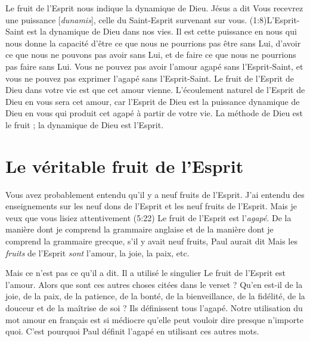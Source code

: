 \Og Le fruit de l'Esprit \Fg{} nous indique la dynamique de Dieu.
 Jésus a dit\frcolon{} \Og Vous recevrez une puissance [\emph{dunamis}],
 celle du Saint-Esprit survenant sur vous. \Fg{}
 (1:8)L'Esprit-Saint est la dynamique de Dieu dans nos vies.
 Il est cette puissance en nous qui nous donne la capacité
 d'être ce que nous ne pourrions pas être sans Lui,
 d'avoir ce que nous ne pouvons pas avoir sans Lui,
 et de faire ce que nous ne pourrions pas faire sans Lui.
 Vous ne pouvez pas avoir l'amour agapé sans l'Esprit-Saint,
 et vous ne pouvez pas exprimer l'agapé sans l'Esprit-Saint.
 Le fruit de l'Esprit de Dieu dans votre vie est que cet amour vienne.
 L'écoulement naturel de l'Esprit de Dieu en vous sera cet amour,
 car l'Esprit de Dieu est la puissance dynamique de Dieu
 en vous qui produit cet agapé à partir de votre vie.
 La méthode de Dieu est le fruit ; la dynamique de Dieu est l'Esprit.


\section{Le v\'eritable fruit de l'Esprit}

Vous avez probablement entendu qu'il y a neuf fruits de l'Esprit.
 J'ai entendu des enseignements sur les neuf dons de l'Esprit
 et les neuf fruits de l'Esprit. Mais je veux que vous lisiez
 attentivement (5:22)\frcolon{}
 \Og Le fruit de l'Esprit est l'\emph{agapé}. \Fg{}
 De la manière dont je comprend la grammaire anglaise
 et de la manière dont je comprend la grammaire grecque,
 s'il y avait neuf fruits, Paul aurait dit\frcolon{}
 \Og Mais les \emph{fruits} de l'Esprit \emph{sont} l'amour,
 la joie, la paix, etc. \Fg{}

Mais ce n'est pas ce qu'il a dit. Il a utilisé le singulier\frcolon{}
 \Og Le fruit de l'Esprit est l'amour. \Fg{}
 Alors que sont ces autres choses citées dans le verset ?
 Qu'en est-il de la joie, de la paix, de la patience, de la bonté,
 de la bienveillance, de la fidélité, de la douceur
 et de la maîtrise de soi ? Ils définissent tous l'agapé.
 Notre utilisation du mot \Og amour \Fg{} en français est si médiocre
 qu'elle peut vouloir dire presque n'importe quoi.
 C'est pourquoi Paul définit l'agapé en utilisant ces autres mots.


